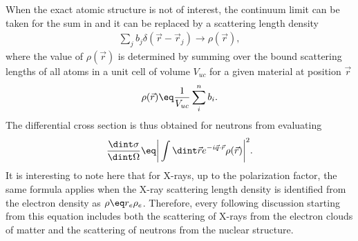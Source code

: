\documentclass[\main/dresen_thesis.tex]{subfiles}
\begin{document}
    When the exact atomic structure is not of interest, the continuum limit can be taken for the sum in  and it can be replaced by a scattering length density
    \begin{align}
      \sum_j b_j \delta(\vec{r} - \vec{r}_j) \rightarrow \rho(\vec{r}),
    \end{align}
    where the value of $\rho(\vec{r})$ is determined by summing over the bound scattering lengths of all atoms in a unit cell of volume $V_{uc}$ for a given material at position $\vec{r}$
    \begin{align}
      \rho(\vec{r}) \eq \frac{1}{V_{uc}} \sum_i^n b_i.
    \end{align}
    The differential cross section is thus obtained for neutrons from evaluating
    \begin{align}
      \frac{\dint \sigma}{\dint \Omega} \eq \bigg| \int \dint \vec{r} e^{-i\vec{q} \cdot \vec{r}} \rho (\vec{r}) \bigg|^2.
      \label{eq:theoreticalBackground:scattering:scatteringTheory:differentialCrossSectionBornApproximation}
    \end{align}
    It is interesting to note here that for X-rays, up to the polarization factor, the same formula applies when the X-ray scattering length density is identified from the electron density as $\rho \eq r_e \rho_e$.
    Therefore, every following discussion starting from this equation includes both the scattering of X-rays from the electron clouds of matter and the scattering of neutrons from the nuclear structure.
\end{document}

